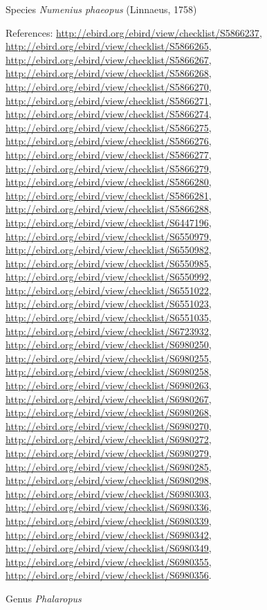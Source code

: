 \documentclass[9pt, article]{memoir}
\begin{document}
\begin{multicols}{2}
\vspace{6pt}\noindent\hspace{36pt}Species \textit{Numenius phaeopus} (Linnaeus, 1758)


\vspace{6pt}References: 
\url{http://ebird.org/ebird/view/checklist/S5866237}, 
\url{http://ebird.org/ebird/view/checklist/S5866265}, 
\url{http://ebird.org/ebird/view/checklist/S5866267}, 
\url{http://ebird.org/ebird/view/checklist/S5866268}, 
\url{http://ebird.org/ebird/view/checklist/S5866270}, 
\url{http://ebird.org/ebird/view/checklist/S5866271}, 
\url{http://ebird.org/ebird/view/checklist/S5866274}, 
\url{http://ebird.org/ebird/view/checklist/S5866275}, 
\url{http://ebird.org/ebird/view/checklist/S5866276}, 
\url{http://ebird.org/ebird/view/checklist/S5866277}, 
\url{http://ebird.org/ebird/view/checklist/S5866279}, 
\url{http://ebird.org/ebird/view/checklist/S5866280}, 
\url{http://ebird.org/ebird/view/checklist/S5866281}, 
\url{http://ebird.org/ebird/view/checklist/S5866288}, 
\url{http://ebird.org/ebird/view/checklist/S6447196}, 
\url{http://ebird.org/ebird/view/checklist/S6550979}, 
\url{http://ebird.org/ebird/view/checklist/S6550982}, 
\url{http://ebird.org/ebird/view/checklist/S6550985}, 
\url{http://ebird.org/ebird/view/checklist/S6550992}, 
\url{http://ebird.org/ebird/view/checklist/S6551022}, 
\url{http://ebird.org/ebird/view/checklist/S6551023}, 
\url{http://ebird.org/ebird/view/checklist/S6551035}, 
\url{http://ebird.org/ebird/view/checklist/S6723932}, 
\url{http://ebird.org/ebird/view/checklist/S6980250}, 
\url{http://ebird.org/ebird/view/checklist/S6980255}, 
\url{http://ebird.org/ebird/view/checklist/S6980258}, 
\url{http://ebird.org/ebird/view/checklist/S6980263}, 
\url{http://ebird.org/ebird/view/checklist/S6980267}, 
\url{http://ebird.org/ebird/view/checklist/S6980268}, 
\url{http://ebird.org/ebird/view/checklist/S6980270}, 
\url{http://ebird.org/ebird/view/checklist/S6980272}, 
\url{http://ebird.org/ebird/view/checklist/S6980279}, 
\url{http://ebird.org/ebird/view/checklist/S6980285}, 
\url{http://ebird.org/ebird/view/checklist/S6980298}, 
\url{http://ebird.org/ebird/view/checklist/S6980303}, 
\url{http://ebird.org/ebird/view/checklist/S6980336}, 
\url{http://ebird.org/ebird/view/checklist/S6980339}, 
\url{http://ebird.org/ebird/view/checklist/S6980342}, 
\url{http://ebird.org/ebird/view/checklist/S6980349}, 
\url{http://ebird.org/ebird/view/checklist/S6980355}, 
\url{http://ebird.org/ebird/view/checklist/S6980356}.

\vspace{6pt}\noindent\hspace{30pt}Genus \textit{Phalaropus}



\end{multicols}
\end{document}
